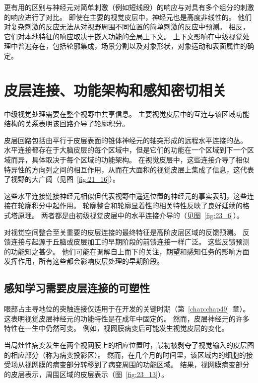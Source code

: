 更有用的区别与神经元对简单刺激（例如短线段）的响应与对具有多个组分的刺激的响应进行了对比。
即使在主要的视觉皮层中，神经元也是高度非线性的。
他们对复杂刺激的反应无法从对视野周围不同位置的简单刺激的反应中预测。
相反，它们对本地特征的响应取决于嵌入功能的全局上下文。
上下文影响在中级视觉处理中普遍存在，包括轮廓集成，场景分割以及对象形状，对象运动和表面属性的确定。



\section{皮层连接、功能架构和感知密切相关}

中级视觉处理需要在整个视野中共享信息。
主要视觉皮层中的互连与该区域功能结构的关系表明该回路介导了轮廓积分。


皮层回路包括由平行于皮层表面的锥体神经元的轴突形成的远程水平连接的丛。
水平连接都存在于大脑皮层的每个区域中，但是它们的功能在一个区域到下一个区域而异，具体取决于每个区域的功能架构。
在视觉皮层中，这些连接介导了相似特异性的方向列之间的相互作用，从而在大面积的视觉皮层上集成了信息，这代表了视野的大广阔（见图~\ref{fig:21_16}）。


这些水平连接链接神经元相似但代表视野中遥远位置的神经元的事实表明，这些连接在轮廓积分中起作用。
轮廓整合和轮廓显着性的相关特性反映了良好延续的格式塔原理。
两者都是由初级视觉皮层中的水平连接介导的（见图~\ref{fig:23_6}）。


对视觉空间整合至关重要的皮层连接的最终特征是高阶皮层区域的反馈预测。
反馈连接与起源于丘脑或皮层加工的早期阶段的前馈连接一样广泛。
这些反馈预测的功能知之甚少。
他们可能在调解自上而下的关注，期望和感知任务的影响方面发挥作用，所有这些都会影响皮层处理的早期阶段。



\subsection{感知学习需要皮层连接的可塑性}

眼部占主导地位的突触连接仅适用于在开发的关键时期（第~\ref{chap:chap49}~章）。
这表明视觉皮层神经元的功能特性是在成年中固定的。
然而，皮层神经元的许多特性在一生中仍然可变。
例如，视网膜病变后可能发生视觉皮层的变化。


当局灶性病变发生在两个视网膜上的相应位置时，最初被剥夺了视觉输入的皮层图的相应部分（称为病变投影区）。
然而，在几个月的时间里，该区域内的细胞的接受场从视网膜的病变部分转移到了病变周围的功能区域。
结果，视网膜病变部分的皮层表示，周围区域的皮层表示（图~\ref{fig:23_13}）。


